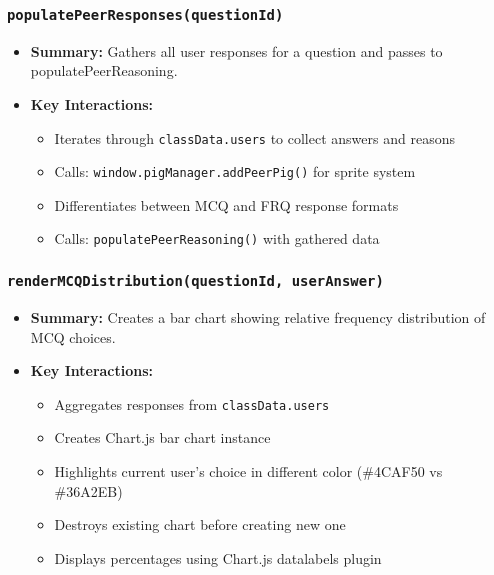 \documentclass[11pt,letterpaper]{article}
\begin{document}
\subsubsection{\texttt{populatePeerResponses(questionId)}}
\begin{itemize}
    \item \textbf{Summary:} Gathers all user responses for a question and passes to populatePeerReasoning.
    \item \textbf{Key Interactions:}
    \begin{itemize}
        \item Iterates through \texttt{classData.users} to collect answers and reasons
        \item Calls: \texttt{window.pigManager.addPeerPig()} for sprite system
        \item Differentiates between MCQ and FRQ response formats
        \item Calls: \texttt{populatePeerReasoning()} with gathered data
    \end{itemize}
\end{itemize}

\subsubsection{\texttt{renderMCQDistribution(questionId, userAnswer)}}
\begin{itemize}
    \item \textbf{Summary:} Creates a bar chart showing relative frequency distribution of MCQ choices.
    \item \textbf{Key Interactions:}
    \begin{itemize}
        \item Aggregates responses from \texttt{classData.users}
        \item Creates Chart.js bar chart instance
        \item Highlights current user's choice in different color (\#4CAF50 vs \#36A2EB)
        \item Destroys existing chart before creating new one
        \item Displays percentages using Chart.js datalabels plugin
    \end{itemize}
\end{itemize}
\end{document}
